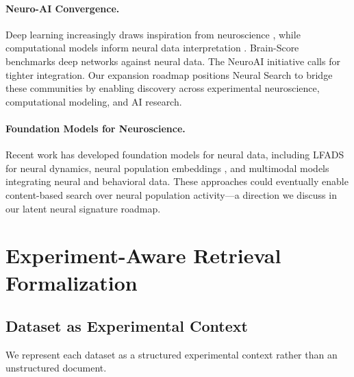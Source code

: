 \documentclass{article}
\theoremstyle{definition}
\begin{document}
\paragraph{Neuro-AI Convergence.} Deep learning increasingly draws inspiration from neuroscience \citep{hassabis2017neuroscience, richards2019deep}, while computational models inform neural data interpretation \citep{saxe2021if}. Brain-Score \citep{schrimpf2018brain} benchmarks deep networks against neural data. The NeuroAI initiative \citep{zador2023catalyzing} calls for tighter integration. Our expansion roadmap positions Neural Search to bridge these communities by enabling discovery across experimental neuroscience, computational modeling, and AI research.

\paragraph{Foundation Models for Neuroscience.} Recent work has developed foundation models for neural data, including LFADS \citep{pandarinath2018inferring} for neural dynamics, neural population embeddings \citep{ye2023neural}, and multimodal models integrating neural and behavioral data. These approaches could eventually enable content-based search over neural population activity---a direction we discuss in our latent neural signature roadmap.

\section{Experiment-Aware Retrieval Formalization}
\label{sec:formalization}

\subsection{Dataset as Experimental Context}

We represent each dataset as a structured experimental context rather than an unstructured document.
\end{document}
